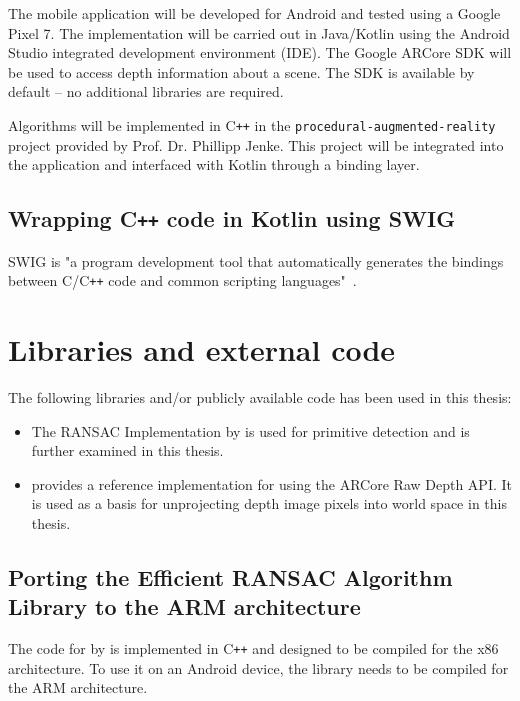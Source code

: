 The mobile application will be developed for Android and tested using a Google Pixel 7.
The implementation will be carried out in Java/Kotlin using the Android Studio integrated development environment (IDE).
The Google ARCore SDK will be used to access depth information about a scene.
The SDK is available by default -- no additional libraries are required.

Algorithms will be implemented in C\texttt{++} in the \texttt{procedural-augmented-reality} project provided by Prof. Dr. Phillipp Jenke.
This project will be integrated into the application and interfaced with Kotlin through a binding layer.

\subsection{Wrapping C\texttt{++} code in Kotlin using SWIG}
SWIG is "a program development tool that automatically generates the bindings between C/C\texttt{++}
code and common scripting languages"~\parencite{beazley_swig_1996}.


\section{Libraries and external code}
The following libraries and/or publicly available code has been used in this thesis:
\begin{itemize}
    \item The RANSAC Implementation by \citeauthor{schnabel_efficient_2007} is used for primitive detection
    and is further examined in this thesis. \parencite{schnabel_efficient_2007}
    \item {} provides a reference implementation for using the ARCore Raw Depth API.
    It is used as a basis for unprojecting depth image pixels into world space in this thesis.~\parencite{google_llc_codelab_raw_depth}
\end{itemize}

\subsection{Porting the Efficient RANSAC Algorithm Library to the ARM architecture}
The code for  by \citeauthor{schnabel_efficient_2007} is implemented in C\texttt{++}
and designed to be compiled for the x86 architecture.
To use it on an Android device, the library needs to be compiled for the ARM architecture.

